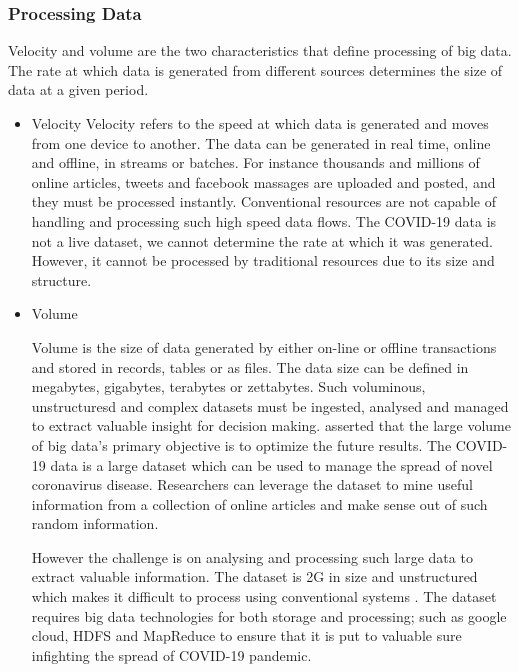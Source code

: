 \documentclass[11pt,twoside,conference]{IEEEtran}
\begin{document}
\subsubsection{Processing Data}

Velocity and volume are the two characteristics that define processing of big data.  The rate at which data is generated from different sources determines the size of data at a given period. 
\begin{itemize}

    \item Velocity
    	Velocity refers to the speed at which data is generated and moves from one device to another. The data can be generated in real time, online and offline, in streams or batches. For instance thousands and millions of online articles, tweets and facebook massages are uploaded and posted, and they must be processed instantly. Conventional resources are not capable of handling and processing such high speed data flows. The COVID-19 data is not a live dataset, we cannot determine the rate at which it was generated. However, it cannot be processed by traditional resources due to its size and structure.
    	
    	\item Volume
    	
    	Volume is the size of data generated by either on-line or offline transactions and stored in records, tables or as files. The data size can be defined in megabytes, gigabytes, terabytes or zettabytes.   Such voluminous, unstructuresd and complex datasets must be ingested, analysed and managed to extract valuable insight for decision making. \cite{Owais} asserted that the large volume of big data’s primary objective is to optimize the future results. The COVID-19 data is a large dataset which can be used to manage the spread of novel coronavirus disease.  Researchers can leverage the dataset to mine useful information from a collection of online articles and make sense out of such random information.
    	
    	
    	However the challenge is on analysing and processing such large data to extract valuable information. The dataset is 2G in size and unstructured which makes it difficult to process using conventional systems \cite{Patel et al}. The dataset requires big data technologies for both storage and processing; such as google cloud, HDFS and MapReduce to ensure that it is put to valuable sure infighting the spread of COVID-19 pandemic.
    	
\end{itemize}
\end{document}
